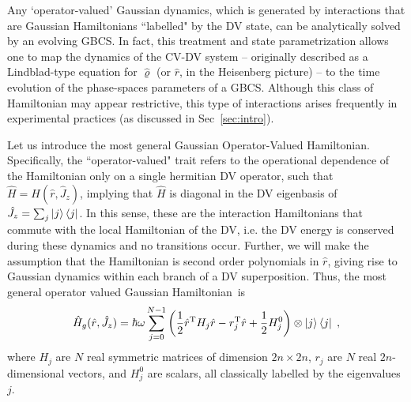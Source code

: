 \documentclass[%
reprint,
superscriptaddress,
nofootinbib,
 amsmath,amssymb,
prx,
floatfix,
]{revtex4-2}
\begin{document}
Any `operator-valued' Gaussian dynamics, which is generated by interactions that are Gaussian Hamiltonians ``labelled" by the DV state, can be analytically solved by an evolving GBCS. In fact, this treatment and state parametrization allows one to map the dynamics of the CV-DV system -- originally described as a Lindblad-type equation for $\hat{\varrho}$ (or $\hat{r}$, in the Heisenberg picture) -- to the time evolution of the phase-spaces parameters of a GBCS. Although this class of Hamiltonian may appear restrictive, this type of interactions arises frequently in experimental practices (as discussed in Sec~\ref{sec:intro}). 

Let us introduce the most general Gaussian Operator-Valued Hamiltonian. Specifically, the ``operator-valued" trait refers to the operational dependence of the Hamiltonian only on a single hermitian DV operator, such that 
$\hat{H}=H (\hat{r}, \hat{J}_z)$, implying that $\hat{H}$ is diagonal in the DV eigenbasis of $\hat{J}_z=\sum_{j}\ket{j}\bra{j}$. In this sense, these are the interaction Hamiltonians that commute with the local Hamiltonian of the DV, i.e. the DV energy is conserved during these dynamics and no transitions occur. Further, we will make the assumption that the Hamiltonian is second order polynomials in $\hat{r}$, giving rise to Gaussian dynamics within each branch of a DV superposition. Thus, the most general operator valued Gaussian Hamiltonian~is 
\begin{equation}
\label{eq:Hamiltonian_max}
    \hat{H}_g (\hat{r}, \hat{J}_z) = \hbar \omega \sum_{j  = 0}^{N-1}\left(  \frac{1}{2} \hat{r}^{\rm T} H_{j} \hat{r} - r_{j} ^{\rm T} \hat{r} +  \frac{1}{2} H_j^0 \right)\otimes \ket{j} \bra{j}     \;,
\end{equation}
where $H_j$ are $N$ real symmetric matrices of dimension $2n \times 2n$, $r_{j}$ are $N$ real $2n$-dimensional vectors, and $H_j^0$ are scalars, all classically labelled by the eigenvalues $j$.
\end{document}
